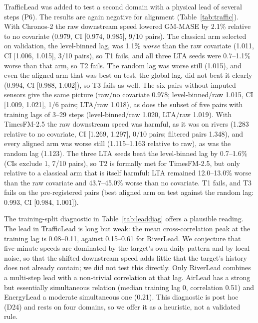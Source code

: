 \documentclass[preprint,11pt,authoryear]{elsarticle}
\newcommand{\lta}{\textsc{LTA}}
\begin{document}
TrafficLead was added to test a second domain with a physical lead of several steps (P6). The results are again negative for alignment (Table~\ref{tab:traffic}). With Chronos-2 the raw downstream speed lowered GM-MASE by 2.1\% relative to no covariate (0.979, CI [0.974, 0.985], 9/10 pairs). The classical arm selected on validation, the level-binned lag, was 1.1\% \emph{worse} than the raw covariate (1.011, CI [1.006, 1.015], 3/10 pairs), so T1 fails, and all three \lta{} seeds were 0.7--1.1\% worse than that arm, so T2 fails. The random lag was worse still (1.015), and even the aligned arm that was best on test, the global lag, did not beat it clearly (0.994, CI [0.988, 1.002]), so T3 fails as well. The six pairs without imputed sensors give the same picture (raw/no covariate 0.978; level-binned/raw 1.015, CI [1.009, 1.021], 1/6 pairs; \lta{}/raw 1.018), as does the subset of five pairs with training lags of 3--29 steps (level-binned/raw 1.020, \lta{}/raw 1.019). With TimesFM-2.5 the raw downstream speed was harmful, as it was on rivers (1.283 relative to no covariate, CI [1.269, 1.297], 0/10 pairs; filtered pairs 1.348), and every aligned arm was worse still (1.115--1.163 relative to raw), as was the random lag (1.123). The three \lta{} seeds beat the level-binned lag by 0.7--1.6\% (CIs exclude 1, 7/10 pairs), so T2 is formally met for TimesFM-2.5, but only relative to a classical arm that is itself harmful: \lta{} remained 12.0--13.0\% worse than the raw covariate and 43.7--45.0\% worse than no covariate. T1 fails, and T3 fails on the pre-registered pairs (best aligned arm on test against the random lag: 0.993, CI [0.984, 1.001]).

The training-split diagnostic in Table~\ref{tab:leaddiag} offers a plausible reading. The lead in TrafficLead is long but weak: the mean cross-correlation peak at the training lag is 0.08--0.11, against 0.15--0.61 for RiverLead. We conjecture that five-minute speeds are dominated by the target's own daily pattern and by local noise, so that the shifted downstream speed adds little that the target's history does not already contain; we did not test this directly. Only RiverLead combines a multi-step lead with a non-trivial correlation at that lag. AirLead has a strong but essentially simultaneous relation (median training lag 0, correlation 0.51) and EnergyLead a moderate simultaneous one (0.21). This diagnostic is post hoc (D24) and rests on four domains, so we offer it as a heuristic, not a validated rule.



\end{document}
